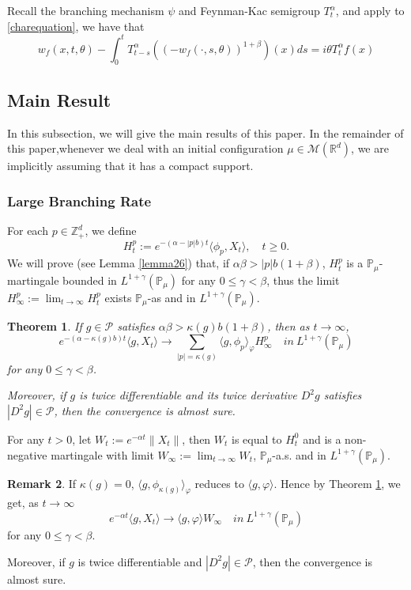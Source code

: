\documentclass[12pt, a4paper]{amsart}
\newtheorem{thm}{Theorem}[section]
\theoremstyle{definition}
\newtheorem{rem}[thm]{Remark}
\numberwithin{equation}{section}
\begin{document}
Recall the branching mechanism $\psi$ and Feynman-Kac semigroup $T^{\alpha}_t$, and apply \cite[Proposition 2.9]{Li2011Measure} to \eqref{charequation}, we have that
\begin{equation}\label{chareq2}
        w_f(x,t,\theta)-\int_0^t T^{\alpha}_{t-s} \left( (-w_f(\cdot,s,\theta))^{1+\beta}\right)(x)ds=i\theta T^{\alpha}_t f(x)
\end{equation}

\subsection{Main Result}

In this subsection, we will give the main results of this paper. In the remainder of this paper,whenever we deal with an initial configuration $\mu \in \mathcal{M}(\mathbb{R}^d)$, we are implicitly assuming that it has a compact support.
\subsubsection{Large Branching Rate}

For each $p\in \mathbb{Z}_+^d$, we define 
$$H_t^p:= e^{-(\alpha-|p|b)t}\langle\phi_p,X_t\rangle,\quad t\geq 0.$$
 We will prove (see Lemma \ref{lemma26}) that, if $\alpha\beta>|p|b(1+\beta)$, $H_t^p$ is a $\mathbb{P}_{\mu}$-martingale bounded in $L^{1+\gamma}(\mathbb{P}_{\mu})$ for any $0\leq\gamma<\beta$, thus the limit $H^p_{\infty}:=\lim_{t\rightarrow \infty}H_t^p$ exists $\mathbb{P}_{\mu}$-as and in $L^{1+\gamma}(\mathbb{P}_{\mu})$.
 \begin{thm}\label{Theorem11}
     If $g \in \mathcal{P}$ satisfies $\alpha\beta>\kappa(g)b(1+\beta)$, then as $t\rightarrow \infty$,
     $$e^{-(\alpha-\kappa(g)b)t}\langle g, X_t\rangle \rightarrow\sum_{|p|=\kappa(g)}\langle g, \phi_p\rangle_{\varphi} H_{\infty}^p \quad in~ L^{1+\gamma}(\mathbb{P}_{\mu})$$
     for any $0\leq\gamma<\beta$.
     
     Moreover, if $g$ is twice differentiable and its twice derivative $D^2 g$ satisfies $|D^2 g| \in \mathcal{P}$, then the convergence is almost sure. 
 \end{thm}
For any $t>0$, let $W_t:=e^{-\alpha t}\|X_t\|$, then $W_t$ is equal to $H_t^0$ and is a non-negative martingale with limit $W_{\infty}:=\lim_{t\rightarrow\infty}W_t$,  $\mathbb{P}_{\mu}$-a.s. and in $L^{1+\gamma}(\mathbb{P}_{\mu})$.  
 \begin{rem}
    If $\kappa(g)=0$, $\langle g, \phi_{\kappa(g)}\rangle_{\varphi}$ reduces to $\langle g,\varphi\rangle$. Hence by Theorem \ref{Theorem11}, we get, as $t\rightarrow \infty$
     $$e^{-\alpha t}\langle g, X_t\rangle \rightarrow \langle g, \varphi\rangle W_{\infty} \quad in~ L^{1+\gamma}(\mathbb{P}_{\mu})$$
    for any $0\leq\gamma<\beta$.
    
    Moreover, if $g$ is twice differentiable and $|D^2 g| \in \mathcal{P}$, then the convergence is almost sure. 
 \end{rem}
\end{document}
